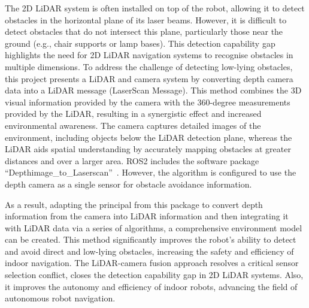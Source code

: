 The 2D LiDAR system is often installed on top of the robot, 
allowing it to detect obstacles in the horizontal plane of its laser beams. 
However, it is difficult to detect obstacles that do not intersect this plane, 
particularly those near the ground (e.g., chair supports or lamp bases). 
This detection capability gap highlights the need for 2D LiDAR navigation systems to recognise obstacles in multiple dimensions. 
To address the challenge of detecting low-lying obstacles, 
this project presents a LiDAR and camera system by converting depth camera data into a LiDAR message (LaserScan Message). 
This method combines the 3D visual information provided by the camera with the 360-degree measurements provided by the LiDAR, 
resulting in a synergistic effect and increased environmental awareness. 
The camera captures detailed images of the environment, 
including objects below the LiDAR detection plane, 
whereas the LiDAR aids spatial understanding by accurately mapping obstacles at greater distances and over a larger area.
ROS2 includes the software package ``Depthimage\_to\_Laserscan''~\cite{rosdepthimage}. 
However, the algorithm is configured to use the depth camera as a single sensor for obstacle avoidance information.

As a result, adapting the principal from this package 
to convert depth information from the camera into LiDAR information 
and then integrating it with LiDAR data via a series of algorithms, 
a comprehensive environment model can be created. 
This method significantly improves the robot's ability to detect and avoid direct 
and low-lying obstacles, increasing the safety and efficiency of indoor navigation.
The LiDAR-camera fusion approach resolves a critical sensor selection conflict, 
closes the detection capability gap in 2D LiDAR systems. 
Also, it improves the autonomy and efficiency of indoor robots, 
advancing the field of autonomous robot navigation.
